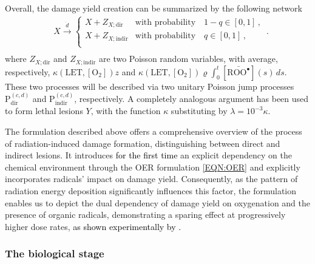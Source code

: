 \documentclass[10pt]{iopart}
\newcommand{\marco}[1]{\textcolor{black}{#1}}
\newcommand{\ema}[1]{\textcolor{black}{#1}}
\numberwithin{table}{section}
\begin{document}
Overall, the damage yield creation can be summarized by the following network
\begin{equation}\label{EQN:Reactd}
\begin{split}
&  X \xrightarrow{\dot{d}}
\begin{cases}
X + Z_{X;\mathrm{dir}} & \mbox{with probability} \quad 1-q \in [0,1]\,,\\
X + Z_{X;\mathrm{indir}} & \mbox{with probability} \quad q \in [0,1]\,,\\
\end{cases}\,.\\
\end{split}
\end{equation}
where $ Z_{X;\mathrm{dir}}$ and $Z_{X;\mathrm{indir}}$ are two Poisson random variables, with average, respectively, $\kappa\left( \mathrm{LET}, [\mathrm{O_2}] \right)z$ and $\kappa\left( \mathrm{LET}, [\mathrm{O_2}] \right)\varrho \int_{0}^t [\bar{\mathrm{ROO^\bullet}}](s) \,ds$. These two processes will be described via two unitary Poisson jump processes $\mathrm{P}^{(c,d)}_{\mathrm{dir}}$ and $\mathrm{P}^{(c,d)}_{\mathrm{indir}}$, respectively. A completely analogous argument has been used to form lethal lesions $Y$, with the function $\kappa$ substituting by $\lambda = 10^{-3} \kappa$.

The formulation described above offers a comprehensive overview of the process of radiation-induced damage formation, distinguishing between direct and indirect lesions. It introduces \ema{for the first time} an explicit dependency on the chemical environment through the OER formulation \eqref{EQN:OER} and explicitly incorporates radicals' impact on damage yield. Consequently, as the pattern of radiation energy deposition significantly influences this factor, the formulation enables us to depict the dual dependency of damage yield on oxygenation and the presence of organic radicals, demonstrating a sparing effect at progressively higher dose rates, \marco{as \ema{shown} experimentally by \cite{Cooper2022, Wanstall2024}.}

\subsubsection*{The biological stage}
\end{document}
